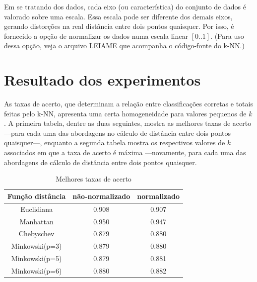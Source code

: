 \documentclass[10pt,a4paper,twocolumn]{article}
\begin{document}
    Em se tratando dos dados, cada eixo (ou característica) do conjunto de dados
    é valorado sobre uma escala. Essa escala pode ser diferente dos demais
    eixos, gerando distorções na real distância entre dois pontos quaisquer. Por
    isso, é fornecido a opção de normalizar os dados numa escala linear 
    $[0..1]$. (Para uso dessa opção, veja o arquivo {\sf LEIAME} que acompanha
    o código-fonte do k-NN.)

  \section{Resultado dos experimentos}

  As taxas de acerto, que determinam a relação entre classificações corretas e
  totais feitas pelo k-NN, apresenta uma certa homogeneidade para valores
  pequenos de $k$. A primeira tabela, dentre as duas seguintes, mostra as
  melhores taxas de acerto ---para cada uma das abordagens no cálculo de
  distância entre dois pontos quaisquer---, enquanto a segunda tabela mostra os
  respectivos valores de $k$ associados em que a taxa de acerto é máxima
  ---novamente, para cada uma das abordagens de cálculo de distância entre dois
  pontos quaisquer.

  \begin{table}[ht]
    \caption{{\scriptsize Melhores taxas de acerto}}
    \centering
    \begin{tabular}{c c c}
      \hline\hline 
      {\scriptsize Função distância} 
      & {\scriptsize não-normalizado} 
      & {\scriptsize normalizado} \\ [0.5ex]
      \hline
      {\scriptsize Euclidiana}     & \small 0.908 & \small 0.907 \\
      {\scriptsize Manhattan}      & \small 0.950 & \small 0.947 \\
      {\scriptsize Chebyschev}     & \small 0.879 & \small 0.880 \\
      {\scriptsize Minkowski(p=3)} & \small 0.879 & \small 0.880 \\
      {\scriptsize Minkowski(p=5)} & \small 0.879 & \small 0.881 \\
      {\scriptsize Minkowski(p=6)} & \small 0.880 & \small 0.882 \\
      [1ex]
      \hline
    \end{tabular}
  \end{table}
\end{document}
